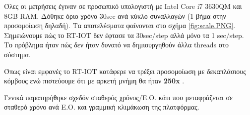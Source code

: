 
Όλες οι μετρήσεις έγιναν σε προσωπικό υπολογιστή με Intel Core i7 3630QM και 8GB RAM. Δόθηκε όριο χρόνο 30sec ανά κύκλο συναλλαγών (1 βήμα στην προσομοίωση δηλαδή). Τα αποτελέσματα φαίνονται στο σχήμα \ref{fig:scale.PNG}. Σημειώνουμε πώς το RT-IOT δεν έφτασε τα 30sec/step αλλά μόνο τα 1 sec/step. Το πρόβλημα ήταν πώς δεν ήταν δυνατό να δημιουργηθούν άλλα threads στο σύστημα.

Όπως είναι εμφανές το RT-IOT κατάφερε να τρέξει προσομοίωση με δεκαπλάσιους κόμβους ενώ πιστεύουμε ότι με αρκετή μνήμη θα ήταν \textbf{250x} .

Γενικά παρατηρήθηκε σχεδόν σταθερός χρόνος/Ε.Ο. κάτι που μεταφράζεται σε σταθερό χρόνο ανά Ε.Ο. και γραμμική κλιμάκωση της πλατφόρμας.



